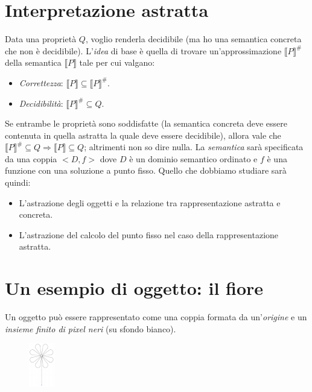 \documentclass[a4paper,oneside,titlepage]{book}
\begin{document}
\section{Interpretazione astratta} %
Data una proprietà $Q$, voglio renderla decidibile (ma ho una semantica concreta che non è decidibile). L'\textit{idea} di base è quella di trovare un'approssimazione $\llbracket P \rrbracket^{\#}$ della semantica $\llbracket P \rrbracket$ tale per cui valgano:
\begin{itemize}
	\item \textit{Correttezza}: $\llbracket P \rrbracket \subseteq \llbracket P \rrbracket^{\#}$.
	\item \textit{Decidibilità}: $\llbracket P \rrbracket^{\#} \subseteq Q$.
\end{itemize}
Se entrambe le proprietà sono soddisfatte (la semantica concreta deve essere contenuta in quella astratta la quale deve essere decidibile), allora vale che $\llbracket P \rrbracket^{\#} \subseteq Q \Rightarrow \llbracket P \rrbracket \subseteq Q$; altrimenti non so dire nulla. La \textit{semantica} sarà specificata da una coppia $<D,f>$ dove $D$ è un dominio semantico ordinato e $f$ è una funzione con una soluzione a punto fisso. Quello che dobbiamo studiare sarà quindi:
\begin{itemize}
    \item L'astrazione degli oggetti e la relazione tra rappresentazione astratta e concreta.
    \item L'astrazione del calcolo del punto fisso nel caso della rappresentazione astratta.
\end{itemize}


\section{Un esempio di oggetto: il fiore} %
Un oggetto può essere rappresentato come una coppia formata da un'\textit{origine} e un \textit{insieme finito di pixel neri} (su sfondo bianco).
\begin{figure}[htp]
	\centering
	\includegraphics[width=0.1\textwidth]{fiore.png}
\end{figure}
\end{document}
